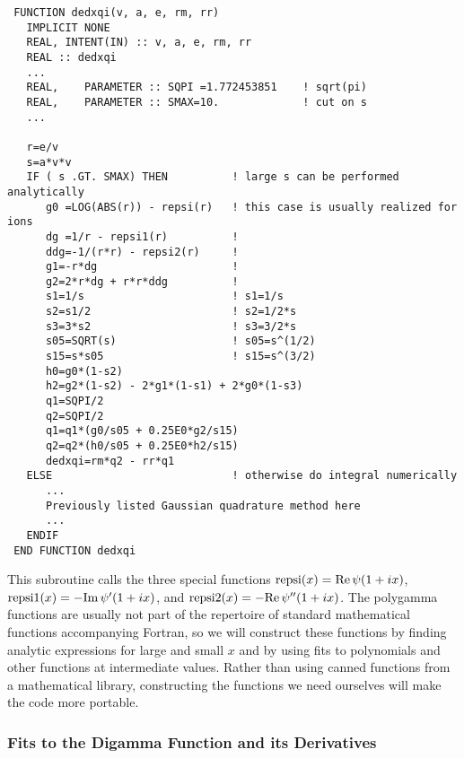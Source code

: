 \documentclass[preprint,12pt,eqsecnum,nofootinbib,amsmath,amssymb]{revtex4}
\begin{document}
{
\baselineskip12pt
\begin{verbatim}
 FUNCTION dedxqi(v, a, e, rm, rr)
   IMPLICIT NONE     
   REAL, INTENT(IN) :: v, a, e, rm, rr
   REAL :: dedxqi
   ...  
   REAL,    PARAMETER :: SQPI =1.772453851    ! sqrt(pi)
   REAL,    PARAMETER :: SMAX=10.             ! cut on s
   ...

   r=e/v   
   s=a*v*v
   IF ( s .GT. SMAX) THEN          ! large s can be performed analytically
      g0 =LOG(ABS(r)) - repsi(r)   ! this case is usually realized for ions
      dg =1/r - repsi1(r)          ! 
      ddg=-1/(r*r) - repsi2(r)     ! 
      g1=-r*dg                     ! 
      g2=2*r*dg + r*r*ddg          !
      s1=1/s                       ! s1=1/s
      s2=s1/2                      ! s2=1/2*s
      s3=3*s2                      ! s3=3/2*s
      s05=SQRT(s)                  ! s05=s^(1/2)
      s15=s*s05                    ! s15=s^(3/2)
      h0=g0*(1-s2)
      h2=g2*(1-s2) - 2*g1*(1-s1) + 2*g0*(1-s3)
      q1=SQPI/2
      q2=SQPI/2
      q1=q1*(g0/s05 + 0.25E0*g2/s15)
      q2=q2*(h0/s05 + 0.25E0*h2/s15)
      dedxqi=rm*q2 - rr*q1
   ELSE                            ! otherwise do integral numerically
      ...
      Previously listed Gaussian quadrature method here
      ...
   ENDIF
 END FUNCTION dedxqi
\end{verbatim}
}

\noindent
This subroutine calls the three special functions ${\rm repsi}(x) 
= {\rm Re}\,\psi(1 + i x)$, ${\rm repsi1}(x) = -{\rm Im}\,
\psi^\prime(1 + i x)$, and ${\rm repsi2}(x) = -{\rm Re}\,
\psi^{\prime\prime}(1 + i x)$. The polygamma functions
are usually not part of the repertoire of standard mathematical
functions accompanying Fortran, so we will construct these
functions by finding analytic expressions for large and
small $x$ and by using fits to polynomials and other functions 
at intermediate values. Rather than using canned functions from
a mathematical library, constructing the functions we need ourselves 
will make the code more portable. 

\subsubsection{Fits to the Digamma Function and its Derivatives}
\end{document}
